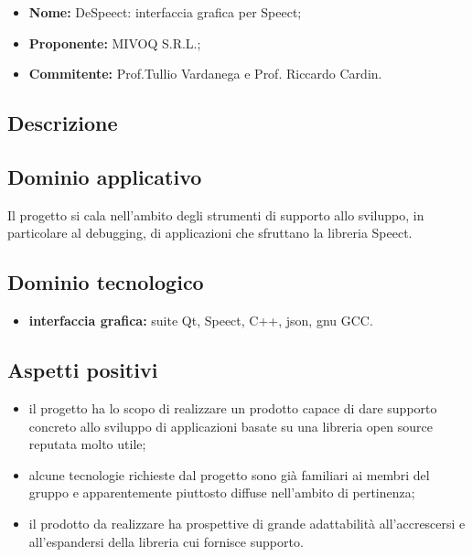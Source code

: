 \documentclass[openany,12pt,a4paper]{report}
\begin{document}
\begin{itemize}
    \item \textbf{Nome:} DeSpeect: interfaccia grafica per Speect;
    \item \textbf{Proponente:} MIVOQ S.R.L.;
    \item \textbf{Commitente:} Prof.Tullio Vardanega e Prof. Riccardo Cardin.
\end{itemize}

\subsection{Descrizione}

\subsection{Dominio applicativo}

Il progetto si cala nell'ambito degli strumenti di supporto allo sviluppo, in particolare al debugging, di applicazioni che sfruttano la libreria Speect.


\subsection{Dominio tecnologico}

\begin{itemize}
    \item \textbf{interfaccia grafica:} suite Qt, Speect, C++, json, gnu GCC.
\end{itemize}

\subsection{Aspetti positivi}

\begin{itemize}
    \item il progetto ha lo scopo di realizzare un prodotto capace di dare supporto concreto allo sviluppo di applicazioni basate su una libreria open source reputata molto utile;
    
    \item alcune tecnologie richieste dal progetto sono già familiari ai membri del gruppo e apparentemente piuttosto diffuse nell'ambito di pertinenza;
    
    \item il prodotto da realizzare ha prospettive di grande adattabilità all'accrescersi e all'espandersi della libreria cui fornisce supporto.
\end{itemize}
\end{document}
